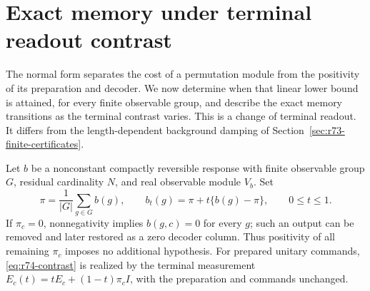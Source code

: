 \section{Exact memory under terminal readout contrast}
\label{sec:r74-contrast}

The normal form separates the cost of a permutation module from the positivity
of its preparation and decoder. We now determine when that linear lower bound
is attained, for every finite observable group, and describe the exact memory
transitions as the terminal contrast varies. This is a change of terminal
readout. It differs from the length-dependent background damping of
Section~\ref{sec:r73-finite-certificates}.

Let $b$ be a nonconstant compactly reversible response with finite observable
group $G$, residual cardinality $N$, and real observable module $V_b$. Set
\begin{equation}\label{eq:r74-contrast}
 \pi=\frac1{|G|}\sum_{g\in G}b(g),\qquad
 b_t(g)=\pi+t\{b(g)-\pi\},\qquad 0\le t\le1.
\end{equation}
If $\pi_c=0$, nonnegativity implies $b(g,c)=0$ for every $g$; such an output
can be removed and later restored as a zero decoder column. Thus positivity
of all remaining $\pi_c$ imposes no additional hypothesis. For prepared
unitary commands, \eqref{eq:r74-contrast} is realized by the terminal
measurement $E_c(t)=tE_c+(1-t)\pi_c I$, with the preparation and commands
unchanged.

